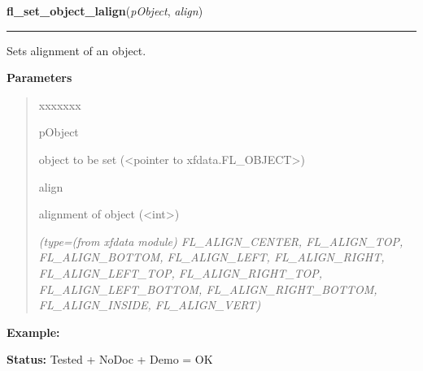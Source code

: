 \hspace{.8\funcindent}\begin{boxedminipage}{\funcwidth}

    \raggedright \textbf{fl\_set\_object\_lalign}(\textit{pObject}, \textit{align})

    \vspace{-1.5ex}

    \rule{\textwidth}{0.5\fboxrule}
\setlength{\parskip}{2ex}
    Sets alignment of an object.

\setlength{\parskip}{1ex}
      \textbf{Parameters}
      \vspace{-1ex}

      \begin{quote}
        \begin{Ventry}{xxxxxxx}

          \item[pObject]

          object to be set ({\textless}pointer to 
          xfdata.FL\_OBJECT{\textgreater})

          \item[align]

          alignment of object ({\textless}int{\textgreater})

            {\it (type=(from xfdata module) FL\_ALIGN\_CENTER, FL\_ALIGN\_TOP, FL\_ALIGN\_BOTTOM, 
FL\_ALIGN\_LEFT, FL\_ALIGN\_RIGHT, FL\_ALIGN\_LEFT\_TOP, 
FL\_ALIGN\_RIGHT\_TOP, FL\_ALIGN\_LEFT\_BOTTOM, FL\_ALIGN\_RIGHT\_BOTTOM, 
FL\_ALIGN\_INSIDE, FL\_ALIGN\_VERT)}

        \end{Ventry}

      \end{quote}

\textbf{Example:} 

\textbf{Status:} Tested + NoDoc + Demo = OK



    \end{boxedminipage}

    \label{xformslib:library:fl_get_object_lalign}

    \vspace{0.5ex}

